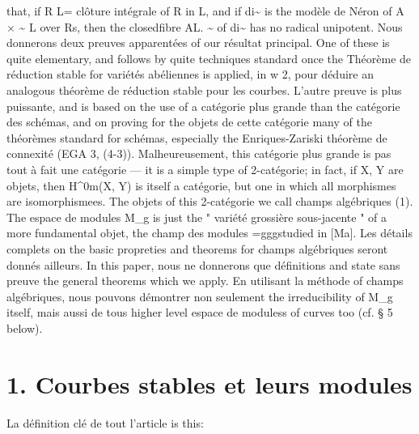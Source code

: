 \documentclass[11pt]{article}
\theoremstyle{plain}
\theoremstyle{definition}
\theoremstyle{remark}
\begin{document}
that, if R L= cl\^oture int\'egrale of R in L, and if di\textasciitilde{} is the mod\`ele de N\'eron of A $\times$ \textasciitilde{} L over Rs, then the closedfibre AL. \textasciitilde{} of di\textasciitilde{} has no radical unipotent. Nous donnerons deux preuves apparent\'ees of our r\'esultat principal. One of these is quite elementary, and follows by quite techniques standard once the Th\'eor\`eme de r\'eduction stable for vari\'et\'es ab\'eliennes is applied, in w 2, pour d\'eduire an analogous th\'eor\`eme de r\'eduction stable pour les courbes. L'autre preuve is plus puissante, and is based on the use of a cat\'egorie plus grande than the cat\'egorie des sch\'emas, and on proving for the objets de cette cat\'egorie many of the th\'eor\`emes standard for sch\'emas, especially the Enriques-Zariski th\'eor\`eme de connexit\'e (EGA 3, (4-3)). Malheureusement, this cat\'egorie plus grande is pas tout \`a fait une cat\'egorie --- it is a simple type of 2-cat\'egorie; in fact, if X, Y are objets, then H\textasciicircum{}0m(X, Y) is itself a cat\'egorie, but one in which all morphismes are isomorphismees. The objets of this 2-cat\'egorie we call champs alg\'ebriques (1). The espace de modules M\_g is just the " vari\'et\'e grossi\`ere sous-jacente " of a more fundamental objet, the champ des modules =gggstudied in [Ma]. Les d\'etails complets on the basic propreties and theorems for champs alg\'ebriques seront donn\'es ailleurs. In this paper, nous ne donnerons que d\'efinitions and state sans preuve the general theorems which we apply. En utilisant la m\'ethode of champs alg\'ebriques, nous pouvons d\'emontrer non seulement the irreducibility of M\_g itself, mais aussi de tous higher level espace de moduless of curves too (cf. § 5 below).

\section*{1. Courbes stables et leurs modules}
La d\'efinition cl\'e de tout l'article is this:
\end{document}
